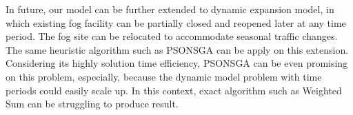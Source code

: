 \documentclass[10pt,journal,compsoc]{IEEEtran}
\begin{document}




In future, our model can be further extended to dynamic expansion model, in which existing fog facility can be partially closed and reopened later at any time period. The fog site can be relocated to accommodate seasonal traffic changes. The same heuristic algorithm such as PSONSGA can be apply on this extension. Considering its highly solution time efficiency, PSONSGA can be even promising on this problem, especially, because the dynamic model problem with time periods could easily scale up. In this context, exact algorithm such as Weighted Sum can be struggling to produce result.






%
\end{document}
